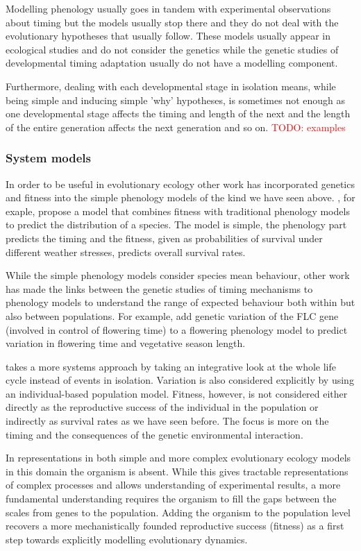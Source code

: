\documentclass[phd]{infthesis}
\newcommand{\todo}[1]{\textcolor{red}{TODO: #1}}
\begin{document}
Modelling phenology usually goes in tandem with experimental observations about
timing but the models usually stop there and they do not deal with the
evolutionary hypotheses that usually follow. These models usually appear in
ecological studies and do not consider the genetics while the genetic studies of
developmental timing adaptation usually do not have a modelling component.

Furthermore, dealing with each developmental stage in isolation means, while
being simple and inducing simple 'why' hypotheses, is sometimes not enough as one
developmental stage affects the timing and length of the next and the length of
the entire generation affects the next generation and so on.
\todo{examples}

\subsubsection*{System models}
In order to be useful in evolutionary ecology other work has incorporated
genetics and fitness into the simple phenology models of the kind we have seen
above. \citet{chuine_phenology_2001}, for exaple, propose a model that combines
fitness with traditional phenology models to predict the distribution of a
species. The model is simple, the phenology part predicts the timing and the
fitness, given as probabilities of survival under different weather stresses,
predicts overall survival rates.

While the simple phenology models consider species mean behaviour, other work
has made the links between the genetic studies of timing mechanisms to phenology
models to understand the range of expected behaviour both within but also
between populations. For example, \citet{wilczek_effects_2009} add genetic
variation of the FLC gene (involved in control of flowering time) to a flowering
phenology model to predict variation in flowering time and vegetative season
length.

\citet{burghardt_modeling_2015} takes a more systems approach by taking an
integrative look at the whole life cycle instead of events in
isolation. Variation is also considered explicitly by using an individual-based
population model. Fitness, however, is not considered either directly as the
reproductive success of the individual in the population or indirectly as
survival rates as we have seen before. The focus is more on the timing and the
consequences of the genetic environmental interaction.

In representations in both simple and more complex evolutionary ecology models
in this domain the organism is absent. While this gives tractable
representations of complex processes and allows understanding of experimental
results, a more fundamental understanding requires the organism to fill the gaps
between the scales from genes to the population. Adding the organism to the
population level recovers a more mechanistically founded reproductive success
(fitness) as a first step towards explicitly modelling evolutionary dynamics.
\end{document}
